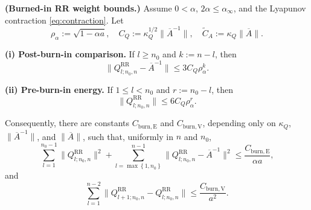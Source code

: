 \begin{lemma}\label{lem:burn-rr-weight-bounds}
  \textbf{(Burned-in RR weight bounds.)}
  Assume $0 < \alpha$, $2 \alpha \le \alpha_{\infty}$, and the Lyapunov contraction
  \eqref{eq:contraction}. Let
  \[
\rho_{\alpha} := \sqrt{1 - \alpha a},
  \quad
  C_{Q} := \kappa_{Q}^{1 / 2} \lVert \overline{A}^{-1} \rVert,
  \quad
  \tilde{C}_{A} := \kappa_{Q} \lVert \overline{A} \rVert.
\]

  \textbf{(i) Post-burn-in comparison.} If $l \ge n_{0}$ and $k := n - l$, then
  \begin{equation}
\lVert Q_{l; n_{0}, n}^{\mathrm{RR}} - \overline{A}^{-1} \rVert
    \le 3 C_{Q} \rho_{\alpha}^{k}.
\label{eq:burn-post-weight-error}
\end{equation}

  \textbf{(ii) Pre-burn-in energy.} If $1 \le l < n_{0}$ and $r := n_{0} - l$, then
  \begin{equation}
\lVert Q_{l; n_{0}, n}^{\mathrm{RR}} \rVert
    \le 6 C_{Q} \rho_{\alpha}^{r}.
\label{eq:burn-pre-weight-size}
\end{equation}

  Consequently, there are constants $C_{\mathrm{burn,E}}$ and $C_{\mathrm{burn,V}}$,
  depending only on $\kappa_{Q}$, $\lVert \overline{A}^{-1} \rVert$, and
  $\lVert \overline{A} \rVert$, such that, uniformly in $n$ and $n_{0}$,
  \begin{equation}
\sum_{l = 1}^{n_{0} - 1} \lVert Q_{l; n_{0}, n}^{\mathrm{RR}} \rVert^{2}
  + \sum_{l = \max\left\{1, n_{0}\right\}}^{n - 1}
      \lVert Q_{l; n_{0}, n}^{\mathrm{RR}} - \overline{A}^{-1} \rVert^{2}
    \le \frac{C_{\mathrm{burn,E}}}{\alpha a},
\label{eq:burn-weight-energy}
\end{equation}
  and
  \begin{equation}
\sum_{l = 1}^{n - 2}
    \lVert Q_{l + 1; n_{0}, n}^{\mathrm{RR}} - Q_{l; n_{0}, n}^{\mathrm{RR}} \rVert
    \le \frac{C_{\mathrm{burn,V}}}{a^{2}}.
\label{eq:burn-weight-variation}
\end{equation}
\end{lemma}

